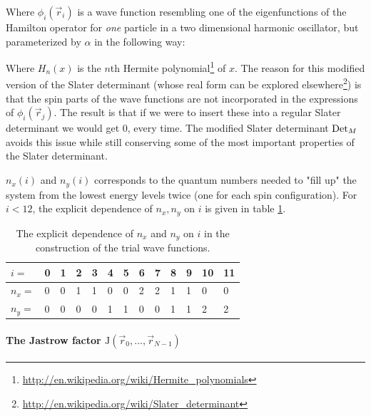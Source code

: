 Where $\phi_i(\vec r_i)$ is a wave function resembling one of the eigenfunctions of the Hamilton operator for \textit{one} particle in a two dimensional harmonic oscillator, but parameterized by $\alpha$ in the following way:

\eqs
{}
\eqf

Where $H_{n}(x)$ is the $n$th Hermite polynomial\footnote{\url{http://en.wikipedia.org/wiki/Hermite_polynomials}} of $x$.
The reason for this modified version of the Slater determinant (whose real form can be explored elsewhere\footnote{\url{http://en.wikipedia.org/wiki/Slater_determinant}}) is that the spin parts of the wave functions are not incorporated in the expressions of $\phi_i(\vec r_j)$. 
The result is that if we were to insert these into a regular Slater determinant we would get $0$, every time. 
The modified Slater determinant $\textrm{Det}_M$ avoids this issue while still conserving some of the most important properties of the Slater determinant. 


$n_x(i)$ and $n_y(i)$ corresponds to the quantum numbers needed to "fill up" the system from the lowest energy levels twice (one for each spin configuration). 
For $i<12$, the explicit dependence of $n_x, n_y$ on $i$ is given in table \ref{tab:dependence_of_nx_on_i}.


\begin{table}[h!]
	\centering
	\begin{tabular}{lllllllllllll}
	\toprule 
	$ i = $ & 0 & 1 & 2 & 3 & 4 & 5 & 6 & 7 & 8 & 9 & 10 & 11 \\
	\midrule
	$n_x = $ & 0 & 0 & 1 & 1 & 0 & 0 & 2 & 2 & 1 & 1 & 0 & 0 \\
	$n_y = $ & 0 & 0 & 0 & 0 & 1 & 1 & 0 & 0 & 1 & 1 & 2 & 2 \\
	\bottomrule
	\end{tabular}
	\caption{The explicit dependence of $n_x$ and $n_y$ on $i$ in the construction of the trial wave functions.}
	\label{tab:dependence_of_nx_on_i}
\end{table}










\paragraph{The Jastrow factor $\textrm{J} (\vec r_0, ... , \vec r_{N-1} )$} \label{sec:jastrow}

